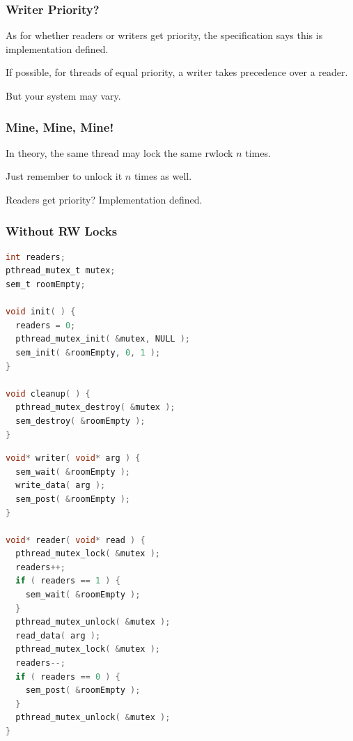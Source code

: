 \begin{frame}
\frametitle{Writer Priority?}

As for whether readers or writers get priority, the specification says this is implementation defined. 

If possible, for threads of equal priority, a writer takes precedence over a reader. 

But your system may vary.


\end{frame}



\begin{frame}
\frametitle{Mine, Mine, Mine!}

In theory, the same thread may lock the same rwlock $n$ times.

Just remember to unlock it $n$ times as well.

Readers get priority? Implementation defined.

\end{frame}


\begin{frame}[fragile]
\frametitle{Without RW Locks}

\begin{multicols}{2}
\begin{lstlisting}[language=C]
int readers;
pthread_mutex_t mutex;
sem_t roomEmpty;

void init( ) {
  readers = 0;
  pthread_mutex_init( &mutex, NULL );
  sem_init( &roomEmpty, 0, 1 );
}

void cleanup( ) {
  pthread_mutex_destroy( &mutex );
  sem_destroy( &roomEmpty );
}
\end{lstlisting}

\columnbreak

\begin{lstlisting}[language=C]
void* writer( void* arg ) {
  sem_wait( &roomEmpty );
  write_data( arg );
  sem_post( &roomEmpty );
}

void* reader( void* read ) {
  pthread_mutex_lock( &mutex );
  readers++;
  if ( readers == 1 ) {
    sem_wait( &roomEmpty );
  }
  pthread_mutex_unlock( &mutex );
  read_data( arg );
  pthread_mutex_lock( &mutex );
  readers--;
  if ( readers == 0 ) {
    sem_post( &roomEmpty );
  }
  pthread_mutex_unlock( &mutex );
}
\end{lstlisting}

\end{multicols}


\end{frame}


